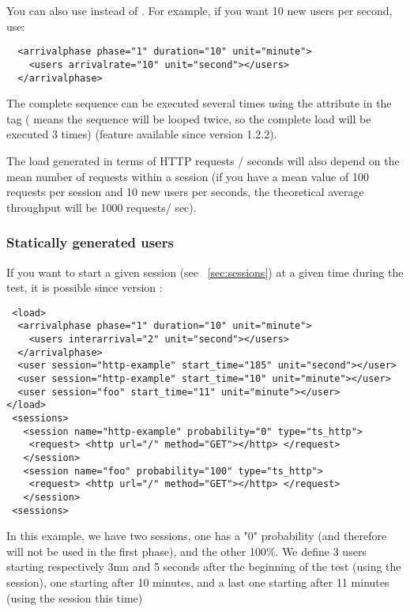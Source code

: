 \documentclass{TSUNG-en}
\begin{document}
You can also use  instead of
. For example, if you want 10 new users per
second, use:

\begin{Verbatim}
  <arrivalphase phase="1" duration="10" unit="minute">
    <users arrivalrate="10" unit="second"></users>
  </arrivalphase>
\end{Verbatim}

The complete sequence can be executed several times using the
 attribute in the  tag
( means the sequence will be looped twice, so the
complete load will be executed 3 times) (feature available since
version 1.2.2).

The load generated in terms of HTTP requests / seconds will also
depend on the mean number of requests within a session (if you have a
mean value of 100 requests per session and 10 new users per seconds,
the theoretical average throughput will be 1000 requests/ sec).

\subsubsection{Statically generated users}

If you want to start a given session (see ~\ref{sec:sessions}) at a given time during the test,
it is possible since version :
\begin{Verbatim}
 <load>
  <arrivalphase phase="1" duration="10" unit="minute">
    <users interarrival="2" unit="second"></users>
  </arrivalphase>
  <user session="http-example" start_time="185" unit="second"></user>
  <user session="http-example" start_time="10" unit="minute"></user>
  <user session="foo" start_time="11" unit="minute"></user>
</load>
 <sessions>
   <session name="http-example" probability="0" type="ts_http">
    <request> <http url="/" method="GET"></http> </request>
   </session>
   <session name="foo" probability="100" type="ts_http">
    <request> <http url="/" method="GET"></http> </request>
   </session>
 <sessions>
\end{Verbatim}

In this example, we have two sessions, one has a "0" probability (and
therefore will not be used in the first phase), and the other
100\%. We define 3 users starting respectively 3mn and 5 seconds
after the beginning of the test (using the 
session), one starting after 10 minutes, and a last one starting after
11 minutes (using the  session this time)
\end{document}
